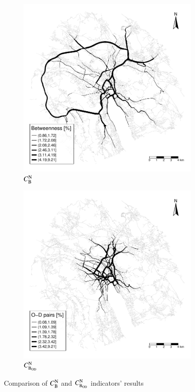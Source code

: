 \documentclass[]{elsarticle} %
\begin{document}
\begin{figure}
\centering
\begin{subfigure}{.45\textwidth}
  \centering
  \includegraphics[width=1\linewidth]{Plots/btw.pdf}  
  \caption{$C_{\rm B}^{\rm N}$}
\end{subfigure}
\begin{subfigure}{.45\textwidth}
  \centering
  \includegraphics[width=1\linewidth]{Plots/od.pdf}  
  \caption{$C_{\rm B_{OD}}^{\rm N}$}
\end{subfigure}
 \caption{Comparison of $C_{\rm B}^{\rm N}$ and $C_{\rm B_{OD}}^{\rm N}$ indicators' results}
  \label{plots_ntw}
\end{figure}
\end{document}
